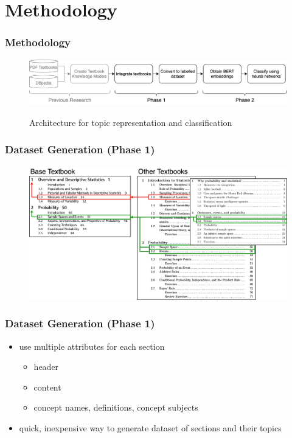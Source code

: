 \documentclass[aspectratio=169]{beamer}
\begin{document}
\section{Methodology}

\begin{frame} \frametitle{Methodology}

\begin{figure}[h]
\centering
\caption*{Architecture for topic representation and classification}
\vspace{0.1cm}
\includegraphics[width=1\textwidth]{simple-architecture.png}
\label{fig:architecture}
\end{figure}

\end{frame}


\begin{frame} \frametitle{Dataset Generation (Phase 1)}

\begin{figure}
    \centering
    \includegraphics[width=1\textwidth]{integration.png}
\end{figure}

\end{frame}


\begin{frame} \frametitle{Dataset Generation (Phase 1)}

\begin{itemize}
    \item use multiple attributes for each section
    \begin{itemize} \itemsep0em
        \item header
        \item content
        \item concept names, definitions, concept subjects
    \end{itemize} 
    \item quick, inexpensive way to generate dataset of sections and their topics
\end{itemize}

\end{frame}
\end{document}
